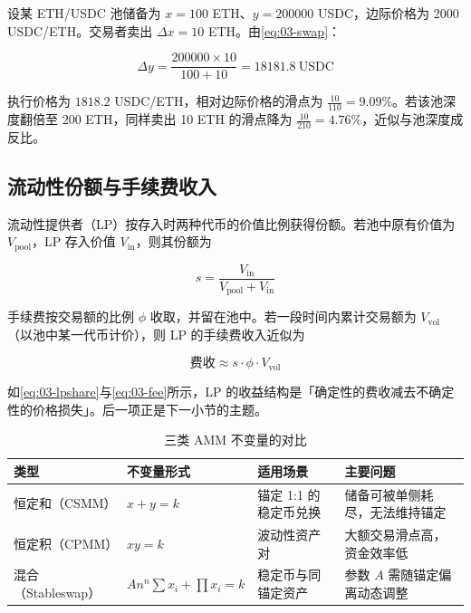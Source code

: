 \begin{example}[滑点的数值计算]\label{ex:03-slippage}
设某 ETH/USDC 池储备为 $x = 100$ ETH、$y = 200000$ USDC，边际价格为 2000 USDC/ETH。交易者卖出 $\Delta x = 10$ ETH。由\cref{eq:03-swap}：

\[
  \Delta y = \frac{200000\times 10}{100+10} = 18181.8\ \text{USDC}
\]

执行价格为 $1818.2$ USDC/ETH，相对边际价格的滑点为 $\frac{10}{110} = 9.09\%$。若该池深度翻倍至 $200$ ETH，同样卖出 10 ETH 的滑点降为 $\frac{10}{210}=4.76\%$，近似与池深度成反比。
\end{example}

\subsection{流动性份额与手续费收入}

流动性提供者（LP）按存入时两种代币的价值比例获得份额。若池中原有价值为 $V_{\text{pool}}$，LP 存入价值 $V_{\text{in}}$，则其份额为

\begin{equation}
  s = \frac{V_{\text{in}}}{V_{\text{pool}}+V_{\text{in}}}
  \label{eq:03-lpshare}
\end{equation}

手续费按交易额的比例 $\phi$ 收取，并留在池中。若一段时间内累计交易额为 $V_{\text{vol}}$（以池中某一代币计价），则 LP 的手续费收入近似为

\begin{equation}
  \text{费收} \approx s\cdot\phi\cdot V_{\text{vol}}
  \label{eq:03-fee}
\end{equation}

如\cref{eq:03-lpshare}与\cref{eq:03-fee}所示，LP 的收益结构是「确定性的费收减去不确定性的价格损失」。后一项正是下一小节的主题。

\begin{table}[htbp]
\centering
\caption{三类 AMM 不变量的对比}\label{tab:03-amm}
\tablefont
\begin{tabular}{@{}lL{2.6cm}L{3.4cm}L{4.6cm}@{}}
\toprule
类型 & 不变量形式 & 适用场景 & 主要问题 \\
\midrule
恒定和（CSMM） & $x+y=k$ & 锚定 1:1 的稳定币兑换 & 储备可被单侧耗尽，无法维持锚定 \\
恒定积（CPMM） & $xy=k$ & 波动性资产对 & 大额交易滑点高，资金效率低 \\
混合（Stableswap） & $An^n\sum x_i + \prod x_i = k$ & 稳定币与同锚定资产 & 参数 $A$ 需随锚定偏离动态调整 \\
\bottomrule
\end{tabular}
\end{table}

